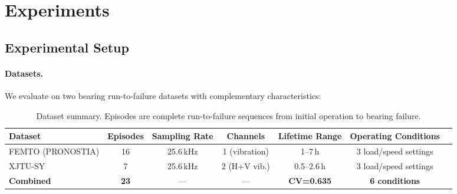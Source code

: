 \section{Experiments}
\label{sec:experiments}

\subsection{Experimental Setup}
\label{sec:setup}

\paragraph{Datasets.} We evaluate on two bearing run-to-failure datasets with complementary characteristics:

\begin{table}[t]
\centering
\caption{Dataset summary. Episodes are complete run-to-failure sequences from initial operation to bearing failure.}
\label{tab:datasets}
\small
\begin{tabular}{@{}lcccccc@{}}
\toprule
Dataset & Episodes & Sampling Rate & Channels & Lifetime Range & Operating Conditions \\
\midrule
FEMTO (PRONOSTIA) & 16 & 25.6\,kHz & 1 (vibration) & 1--7\,h & 3 load/speed settings \\
XJTU-SY & 7 & 25.6\,kHz & 2 (H+V vib.) & 0.5--2.6\,h & 3 load/speed settings \\
\midrule
\textbf{Combined} & \textbf{23} & --- & --- & \textbf{CV=0.635} & \textbf{6 conditions} \\
\bottomrule
\end{tabular}
\end{table}


